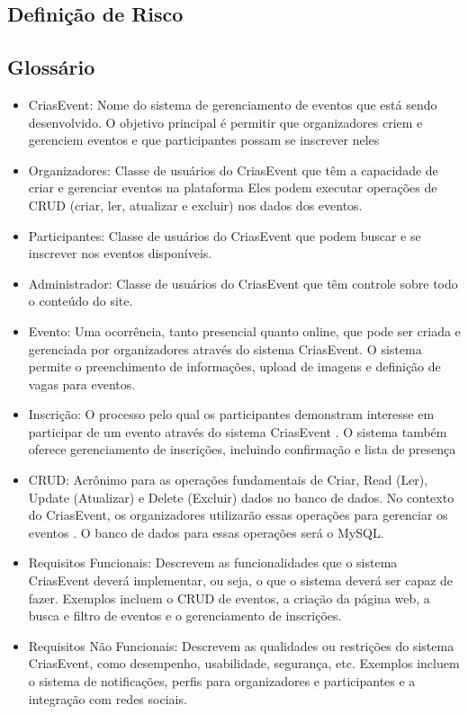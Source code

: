 \section{Definição de Risco}

\begin{appendices}
\chapter{Glossário}
\begin{itemize}
 \item CriasEvent: Nome do sistema de gerenciamento de eventos que está sendo desenvolvido. O objetivo principal é permitir que organizadores criem e gerenciem eventos e que participantes possam se inscrever neles

\item Organizadores: Classe de usuários do CriasEvent que têm a capacidade de criar e gerenciar eventos na plataforma Eles podem executar operações de CRUD (criar, ler, atualizar e excluir) nos dados dos eventos.

\item Participantes: Classe de usuários do CriasEvent que podem buscar e se inscrever nos eventos disponíveis.

\item Administrador: Classe de usuários do CriasEvent que têm controle sobre todo o conteúdo do site.

\item Evento: Uma ocorrência, tanto presencial quanto online, que pode ser criada e gerenciada por organizadores através do sistema CriasEvent. O sistema permite o preenchimento de informações, upload de imagens e definição de vagas para eventos.

\item Inscrição: O processo pelo qual os participantes demonstram interesse em participar de um evento através do sistema CriasEvent . O sistema também oferece gerenciamento de inscrições, incluindo confirmação e lista de presença 

\item CRUD: Acrônimo para as operações fundamentais de Criar, Read (Ler), Update (Atualizar) e Delete (Excluir) dados no banco de dados. No contexto do CriasEvent, os organizadores utilizarão essas operações para gerenciar os eventos . O banco de dados para essas operações será o MySQL.

\item Requisitos Funcionais: Descrevem as funcionalidades que o sistema CriasEvent deverá implementar, ou seja, o que o sistema deverá ser capaz de fazer. Exemplos incluem o CRUD de eventos, a criação da página web, a busca e filtro de eventos e o gerenciamento de inscrições.

\item Requisitos Não Funcionais: Descrevem as qualidades ou restrições do sistema CriasEvent, como desempenho, usabilidade, segurança, etc. Exemplos incluem o sistema de notificações, perfis para organizadores e participantes e a integração com redes sociais.
\end{itemize}
\end{appendices}


